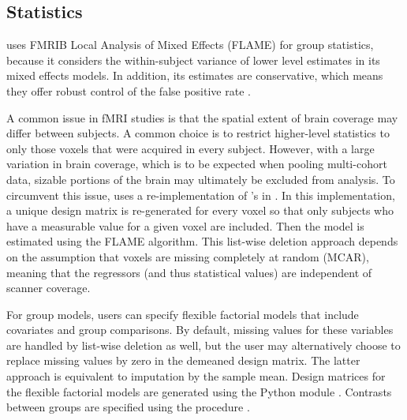 \subsection{Statistics}\label{sec:statistics}

 uses  FMRIB Local Analysis of Mixed Effects
(FLAME) \parencite{woolrich2004} for group statistics,
because it considers the within-subject variance of lower level estimates
in its mixed effects models. In addition, its estimates are conservative,
which means they offer robust control of the false positive rate
\parencite{eklund2016}.

A common issue in fMRI studies is that the spatial extent of brain coverage
may differ between subjects. A common choice is to restrict higher-level
statistics to only those voxels that were acquired in every subject.
However, with a large variation in brain coverage, which is to be expected
when pooling multi-cohort data, sizable portions of the brain may
ultimately be excluded from analysis. To circumvent this issue,
 uses a re-implementation of 's  in
 \parencite{harris2020}. In this implementation, a
unique design matrix is re-generated for every voxel so that only subjects
who have a measurable value for a given voxel are included. Then the model
is estimated using the FLAME algorithm. This list-wise deletion approach
depends on the assumption that voxels are missing completely at random
(MCAR), meaning that the regressors (and thus statistical values) are
independent of scanner coverage.

For group models, users can specify flexible factorial models that include
covariates and group comparisons. By default, missing values for these
variables are handled by list-wise deletion as well, but the user may
alternatively choose to replace missing values by zero in the demeaned
design matrix. The latter approach is equivalent to imputation by the
sample mean. Design matrices for the flexible factorial models are
generated using the Python module 
\parencite{smith2018}. Contrasts between groups are
specified using the  procedure \parencite{lenth2016}.
